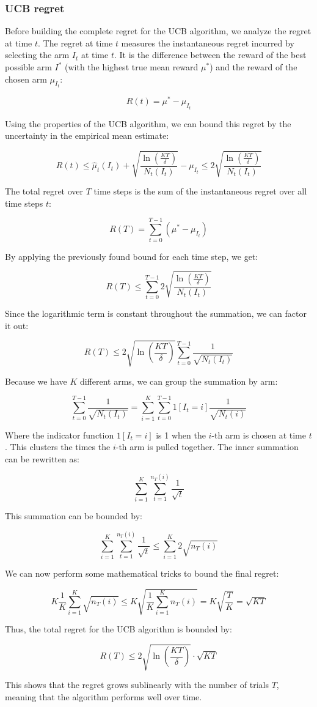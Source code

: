 \subsubsection{UCB regret}

Before building the complete regret for the UCB algorithm, we analyze the regret at time $t$. The regret at time $t$ measures the instantaneous regret incurred by selecting the arm $I_t$ at time $t$. It is the difference between the reward of the best possible arm $I^*$ (with the highest true mean reward $\mu^*$) and the reward of the chosen arm $\mu_{I_t}$:

$$
    R(t) = \mu^* - \mu_{I_t}
$$

Using the properties of the UCB algorithm, we can bound this regret by the uncertainty in the empirical mean estimate:

$$
    R(t) \leq \hat{\mu}_t(I_t) + \sqrt{\frac{\ln\left(\frac{KT}{\delta}\right)}{N_t(I_t)}} - \mu_{I_t} \leq 2 \sqrt{\frac{\ln\left(\frac{KT}{\delta}\right)}{N_t(I_t)}}
$$

The total regret over $T$ time steps is the sum of the instantaneous regret over all time steps $t$:

$$
    R(T) = \sum_{t=0}^{T-1} (\mu^* - \mu_{I_t})
$$

By applying the previously found bound for each time step, we get:

$$
    R(T) \leq \sum_{t=0}^{T-1} 2 \sqrt{\frac{\ln\left(\frac{KT}{\delta}\right)}{N_t(I_t)}}
$$

Since the logarithmic term is constant throughout the summation, we can factor it out:

$$
    R(T) \leq 2 \sqrt{\ln\left(\frac{KT}{\delta}\right)} \sum_{t=0}^{T-1} \frac{1}{\sqrt{N_t(I_t)}}
$$

Because we have $K$ different arms, we can group the summation by arm:

$$
    \sum_{t=0}^{T-1} \frac{1}{\sqrt{N_t(I_t)}} = \sum_{i=1}^{K} \sum_{t=0}^{T-1} 1[I_t = i] \frac{1}{\sqrt{N_t(i)}}
$$

Where the indicator function $1[I_t = i]$ is 1 when the $i$-th arm is chosen at time $t$. This clusters the times the $i$-th arm is pulled together. The inner summation can be rewritten as:

$$
    \sum_{i=1}^{K} \sum_{t=1}^{n_T(i)} \frac{1}{\sqrt{t}}
$$

This summation can be bounded by:

$$
    \sum_{i=1}^{K} \sum_{t=1}^{n_T(i)} \frac{1}{\sqrt{t}} \leq \sum_{i=1}^{K} 2 \sqrt{n_T(i)}
$$

We can now perform some mathematical tricks to bound the final regret:

$$
    K \frac{1}{K} \sum_{i=1}^{K} \sqrt{n_T(i)} \leq K \sqrt{\frac{1}{K} \sum_{i=1}^{K} n_T(i)} = K \sqrt{\frac{T}{K}} = \sqrt{KT}
$$

Thus, the total regret for the UCB algorithm is bounded by:

$$
    R(T) \leq 2 \sqrt{\ln\left(\frac{KT}{\delta}\right)} \cdot \sqrt{KT}
$$

This shows that the regret grows sublinearly with the number of trials $T$, meaning that the algorithm performs well over time.